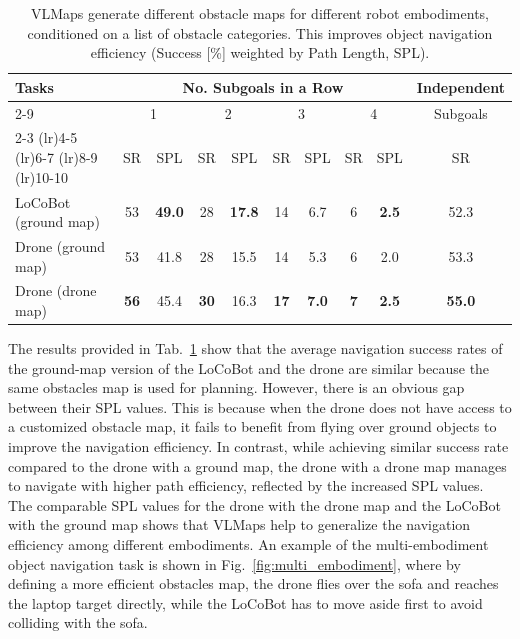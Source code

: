 \documentclass[letterpaper, 10 pt, conference]{ieeeconf}  %
\begin{document}
\begin{table}[h]
  \setlength\tabcolsep{1pt}
  \centering
  \begin{tabular}{lccccccccc}
  \toprule
\multirow{3}[3]{*}{Tasks}  & \multicolumn{8}{c}{No. Subgoals in a Row} &  Independent      \\                
                    \cmidrule(lr){2-9}
        & \multicolumn{2}{c}{1}  & \multicolumn{2}{c}{2} & \multicolumn{2}{c}{3} & \multicolumn{2}{c}{4} &  Subgoals\\
         \cmidrule(lr){2-3}  \cmidrule(lr){4-5}  \cmidrule(lr){6-7}  \cmidrule(lr){8-9}  \cmidrule(lr){10-10}
        & SR      & SPL      & SR      & SPL      & SR      & SPL      & SR      & SPL      & SR      \\
\midrule
LoCoBot (ground map)     & 53      & \textbf{49.0}      & 28      & \textbf{17.8}       & 14      & 6.7       & 6       & \textbf{2.5}        & 52.3      \\
Drone (ground map)       & 53      & 41.8       & 28      & 15.5       & 14      & 5.3       & 6       & 2.0        & 53.3      \\
Drone (drone map)        & \textbf{56} & 45.4 & \textbf{30} & 16.3 & \textbf{17} & \textbf{7.0} & \textbf{7} & \textbf{2.5} & \textbf{55.0}      \\

  \bottomrule
  \end{tabular}
  \caption{VLMaps generate different obstacle maps for different robot embodiments, conditioned on a list of obstacle categories. This improves object navigation efficiency (Success [\%] weighted by Path Length, SPL).}
  \label{table:multi_embodiment_nav}
  \vspace{-1em}
\end{table}

The results provided in Tab.~\ref{table:multi_embodiment_nav} show that the average navigation success rates of the ground-map version of the LoCoBot and the drone are similar because the same obstacles map is used for planning. However, there is an obvious gap between their SPL values. This is because when the drone does not have access to a customized obstacle map, it fails to benefit from flying over ground objects to improve the navigation efficiency. In contrast, while achieving similar success rate compared to the drone with a ground map, the drone with a drone map manages to navigate with higher path efficiency, reflected by the increased SPL values. The comparable SPL values for the drone with the drone map and the LoCoBot with the ground map shows that VLMaps help to generalize the navigation efficiency among different embodiments. An example of the multi-embodiment object navigation task is shown in Fig.~\ref{fig:multi_embodiment}, where by defining a more efficient obstacles map, the drone flies over the sofa and reaches the laptop target directly, while the LoCoBot has to move aside first to avoid colliding with the sofa.
\end{document}
